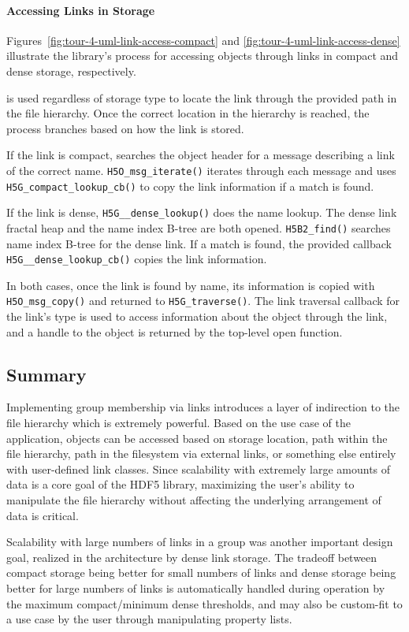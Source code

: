 \paragraph{Accessing Links in Storage} Figures~\ref{fig:tour-4-uml-link-access-compact} and \ref{fig:tour-4-uml-link-access-dense} illustrate the library's process for accessing objects through links in compact and dense storage, respectively.

 is used regardless of storage type to locate the link through the provided path in the file hierarchy. Once the correct location in the hierarchy is reached, the process branches based on how the link is stored.

If the link is compact,  searches the object header for a message describing a link of the correct name. \texttt{H5O\_msg\_iterate()} iterates through each message and uses \texttt{H5G\_compact\_lookup\_cb()} to copy the link information if a match is found.

If the link is dense, \texttt{H5G\_\_dense\_lookup()} does the name lookup. The dense link fractal heap and the name index B-tree are both opened. \texttt{H5B2\_find()} searches name index B-tree for the dense link. If a match is found, the provided callback \texttt{H5G\_\_dense\_lookup\_cb()} copies the link information.

In both cases, once the link is found by name, its information is copied with \texttt{H5O\_msg\_copy()} and returned to \texttt{H5G\_traverse()}. The link traversal callback for the link's type is used to access information about the object through the link, and a handle to the object is returned by the top-level open function.

\subsection{Summary} Implementing group membership via links introduces a layer of indirection to the file hierarchy which is extremely powerful. Based on the use case of the application, objects can be accessed based on storage location, path within the file hierarchy, path in the filesystem via external links, or something else entirely with user-defined link classes. Since scalability with extremely large amounts of data is a core goal of the HDF5 library, maximizing the user's ability to manipulate the file hierarchy without affecting the underlying arrangement of data is critical. 

Scalability with large numbers of links in a group was another important design goal, realized in the architecture by dense link storage. The tradeoff between compact storage being better for small numbers of links and dense storage being better for large numbers of links is automatically handled during operation by the maximum compact/minimum dense thresholds, and may also be custom-fit to a use case by the user through manipulating property lists.